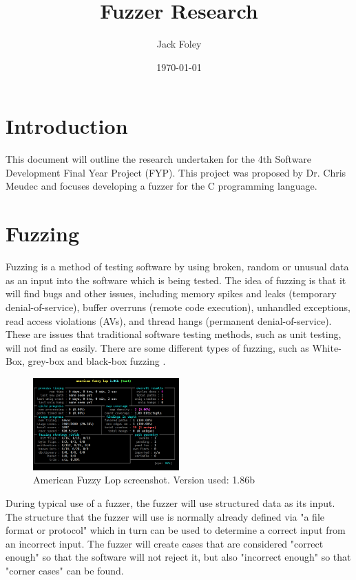 \documentclass[a4paper,12pt]{article}
\title{Fuzzer Research}
\author{Jack Foley}
\date{\today}
\begin{document}
\maketitle

\newpage
{}
\tableofcontents
\listoffigures

\newpage
{}

\section{Introduction}
This document will outline the research undertaken for the 4th Software Development Final Year Project (FYP). 
This project was proposed by Dr. Chris Meudec and focuses developing a fuzzer for the C programming language.

\section{Fuzzing}


Fuzzing is a method of testing software by using broken, random or unusual data as an input 
into the software which is being tested. The idea of fuzzing is that it will find bugs and 
other issues, including memory spikes and leaks (temporary denial-of-service), buffer overruns 
(remote code execution), unhandled exceptions, read access violations (AVs), and thread 
hangs (permanent denial-of-service). These are issues that traditional software testing 
methods, such as unit testing, will not find as easily. There are some different types of 
fuzzing, such as White-Box, grey-box and black-box fuzzing \cite{neystadt2009}.

\begin{figure} %
    \centering
    \caption{American Fuzzy Lop screenshot. Version used: 1.86b \cite{enwiki:1249540069}}
    \includegraphics[width=0.5\textwidth]{afl.png}
\end{figure}

During typical use of a fuzzer, the fuzzer will use structured data as its input. The 
structure that the fuzzer will use is normally already defined via "a file format or 
protocol" \cite{enwiki:1249540069} which in turn can be used to determine a correct input
from an incorrect input. The fuzzer will create cases that are considered 
"correct enough" so that the software will not reject it, but also "incorrect enough" so 
that "corner cases" \cite{enwiki:1249540069} can be found.
\end{document}
